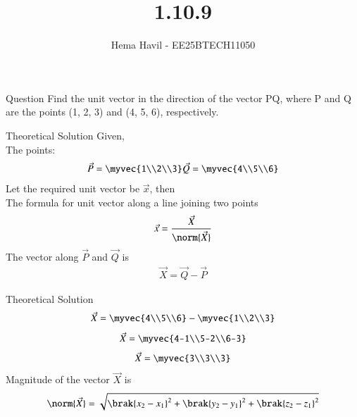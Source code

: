 \documentclass{beamer}
\title %
{1.10.9}
\author %
{Hema Havil - EE25BTECH11050}
\begin{document}
	
	\frame{\titlepage}
	\begin{frame}{Question}
		Find the unit vector in the direction of the vector PQ, where P and Q are the points (1, 2, 3) and (4, 5, 6), respectively.
	\end{frame}

	
\begin{frame}{Theoretical Solution}
	Given,\\
         The points: 
         \begin{align}
             \vec{P}=\myvec{1\\2\\3} \vec{Q}=\myvec{4\\5\\6}
         \end{align}
         Let the required unit vector be $\vec{x}$, then\\ 
         The formula for unit vector along a line joining two points
         \begin{align}
             \vec{x}=\frac{\vec{X}}{\norm{\vec{X}}}
         \end{align}
         The vector along $\vec{P}$ and $\vec{Q}$ is\\
         \begin{align}
             \vec{X}=\vec{Q}-\vec{P}
         \end{align}
\end{frame}
\begin{frame}{Theoretical Solution}
\begin{align}
             \vec{X}=\myvec{4\\5\\6}-\myvec{1\\2\\3}
         \end{align}
         \begin{align}
             \vec{X}=\myvec{4-1\\5-2\\6-3}
         \end{align}
         \begin{align}
             \vec{X}=\myvec{3\\3\\3}
         \end{align}
         Magnitude of the vector $\vec{X}$ is\\
         \begin{align}
             \norm{\vec{X}}=\sqrt{\brak{x_2-x_1}^2+\brak{y_2-y_1}^2+\brak{z_2-z_1}^2}
         \end{align}
	\end{frame}
\end{document}
